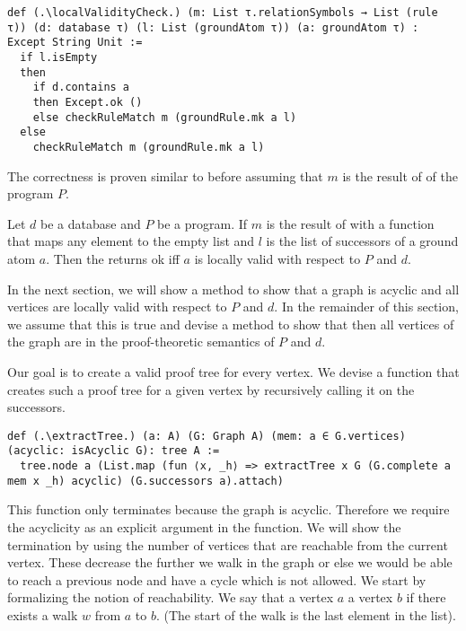 \begin{lstlisting}
def (.\localValidityCheck.) (m: List τ.relationSymbols → List (rule τ)) (d: database τ) (l: List (groundAtom τ)) (a: groundAtom τ) : Except String Unit :=
  if l.isEmpty
  then
    if d.contains a
    then Except.ok ()
    else checkRuleMatch m (groundRule.mk a l)
  else
    checkRuleMatch m (groundRule.mk a l)
\end{lstlisting}

The correctness is proven similar to before assuming that $m$ is the result of \parseProgramToSymbolSequenceMap of the program $P$.

\begin{lemma}[\localValidityCheckUnitIffLocallyValid]
    Let $d$ be a database and $P$ be a program. If $m$ is the result of \parseProgramToSymbolSequenceMap with a function that maps any element to the empty list and $l$ is the list of successors of a ground atom $a$. Then the \localValidityCheck returns ok iff $a$ is locally valid with respect to $P$ and $d$.
\end{lemma}

In the next section, we will show a method to show that a graph is acyclic and all vertices are locally valid with respect to $P$ and $d$. In the remainder of this section, we assume that this is true and devise a method to show that then all vertices of the graph are in the proof-theoretic semantics of $P$ and $d$.

Our goal is to create a valid proof tree for every vertex. We devise a function that creates such a proof tree for a given vertex by recursively calling it on the successors.

\begin{lstlisting}
def (.\extractTree.) (a: A) (G: Graph A) (mem: a ∈ G.vertices) (acyclic: isAcyclic G): tree A :=
  tree.node a (List.map (fun ⟨x, _h⟩ => extractTree x G (G.complete a mem x _h) acyclic) (G.successors a).attach)
\end{lstlisting}

This function only terminates because the graph is acyclic. Therefore we require the acyclicity as an explicit argument in the function. We will show the termination by using the number of vertices that are reachable from the current vertex. These decrease the further we walk in the graph or else we would be able to reach a previous node and have a cycle which is not allowed. We start by formalizing the notion of reachability. We say that a vertex $a$ \canReach a vertex $b$ if there exists a walk $w$ from $a$ to $b$. (The start of the walk is the last element in the list).

